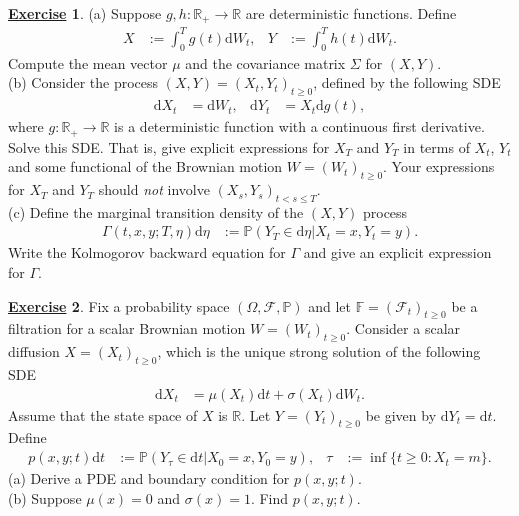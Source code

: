 \documentclass[12pt]{book}
\numberwithin{equation}{chapter}
\theoremstyle{plain}
\numberwithin{theorem}{section}
\theoremstyle{definition}
\newtheorem{exercise}{\underline{Exercise}}
\numberwithin{exercise}{chapter}
\newcommand{\<}{\langle}
\renewcommand{\>}{\rangle}
\renewcommand{\(}{\left(}
\renewcommand{\)}{\right)}
\renewcommand{\[}{\left[}
\renewcommand{\]}{\right]}
\newcommand\Fb{\mathds{F}}
\newcommand\Pb{\mathds{P}}
\newcommand\Rb{\mathds{R}}
\newcommand\Fc{\mathscr{F}}
\newcommand\Om{\Omega}
\newcommand\sig{\sigma}
\newcommand\Sig{\Sigma}
\newcommand\Gam{\Gamma}
\newcommand\dd{\mathrm{d}}
\begin{document}
\begin{exercise}
\label{exer:9.10}
(a) Suppose $g,h : \Rb_+ \to \Rb$ are deterministic functions.  Define
\begin{align}
X
	&:=	\int_0^T g(t) \dd W_t , &
Y
	&:=	\int_0^T h(t) \dd W_t .
\end{align}
Compute the mean vector $\mu$ and the covariance matrix $\Sig$ for $(X, Y)$.
\\[0.5em]
(b) Consider the process $(X,Y) = (X_t,Y_t)_{t \geq 0}$, defined by the following SDE
\begin{align}
\dd X_t
	&=	\dd W_t , &
\dd Y_t
	&=	X_t \dd g(t) ,
\end{align}
where $g: \Rb_+ \to \Rb$ is a deterministic function with a continuous first derivative.  Solve this SDE.  That is, give explicit expressions for $X_T$ and $Y_T$ in terms of $X_t$, $Y_t$ and some functional of the Brownian motion $W = (W_t)_{t \geq 0}$.  Your expressions for $X_T$ and $Y_T$ should \textit{not} involve $(X_s,Y_s)_{t < s \leq T}$.
\\[0.5em]
(c) Define the marginal transition density of the $(X,Y)$ process
\begin{align}
\Gam(t,x,y;T,\eta)\dd \eta
	&:= \Pb( Y_T \in \dd \eta | X_t = x, Y_t = y) .
\end{align}
Write the Kolmogorov backward equation for $\Gam$ and give an explicit expression for $\Gam$.
\end{exercise}

\begin{exercise}
\label{exer:9.11}
Fix a probability space $(\Om, \Fc, \Pb)$ and let $\Fb = (\Fc_t)_{t \geq 0}$ be a filtration for a scalar Brownian motion $W = (W_t)_{t \geq 0}$.
Consider a scalar diffusion $X = (X_t)_{t \geq 0}$, which is the unique strong solution of the following SDE
\begin{align}
\dd X_t
	&=	\mu(X_t) \dd t + \sig(X_t) \dd W_t .
\end{align}
Assume that the state space of $X$ is $\Rb$. 
Let $Y = (Y_t)_{t \geq 0}$ be given by $\dd Y_t = \dd t$.
Define
\begin{align}
p(x,y;t) \dd t 
	&:= \Pb( Y_\tau \in \dd t | X_0 = x, Y_0 = y ) , &
\tau
	&:= \inf \{ t \geq 0 : X_t = m \} .
\end{align}
(a) Derive a PDE and boundary condition for $p(x,y;t)$.
\\[0.5em]
(b) Suppose $\mu(x) = 0$ and $\sig(x) = 1$.  Find $p(x,y;t)$.
\end{exercise}
\end{document}
